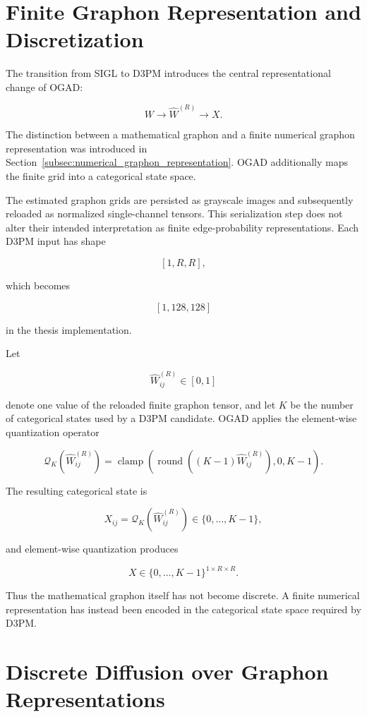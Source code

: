 \section{Finite Graphon Representation and Discretization}
\label{sec:method_graphon_discretization}

The transition from SIGL to D3PM introduces the central representational change of OGAD:

\[
W
\longrightarrow
\widehat{W}^{(R)}
\longrightarrow
X.
\]

The distinction between a mathematical graphon and a finite numerical graphon representation was introduced in Section~\ref{subsec:numerical_graphon_representation}. OGAD additionally maps the finite grid into a categorical state space.

The estimated graphon grids are persisted as grayscale images and subsequently reloaded as normalized single-channel tensors. This serialization step does not alter their intended interpretation as finite edge-probability representations. Each D3PM input has shape

\[
[1,R,R],
\]

which becomes

\[
[1,128,128]
\]

in the thesis implementation.

Let

\[
\widehat{W}^{(R)}_{ij}\in[0,1]
\]

denote one value of the reloaded finite graphon tensor, and let \(K\) be the number of categorical states used by a D3PM candidate. OGAD applies the element-wise quantization operator

\[
\mathcal{Q}_K
\left(
\widehat{W}^{(R)}_{ij}
\right)
=
\operatorname{clamp}
\left(
\operatorname{round}
\left(
(K-1)\widehat{W}^{(R)}_{ij}
\right),
0,
K-1
\right).
\]

The resulting categorical state is

\[
X_{ij}
=
\mathcal{Q}_K
\left(
\widehat{W}^{(R)}_{ij}
\right)
\in
\{0,\ldots,K-1\},
\]

and element-wise quantization produces

\[
X
\in
\{0,\ldots,K-1\}^{1\times R\times R}.
\]

Thus the mathematical graphon itself has not become discrete. A finite numerical representation has instead been encoded in the categorical state space required by D3PM.

\section{Discrete Diffusion over Graphon Representations}
\label{sec:method_d3pm}

